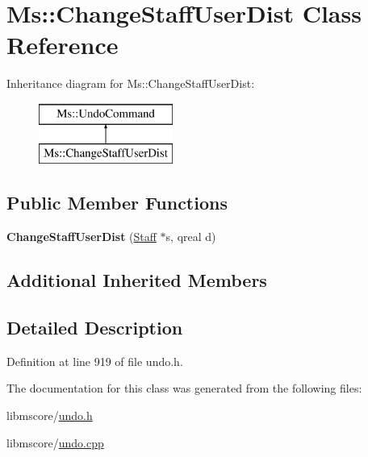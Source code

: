 \hypertarget{class_ms_1_1_change_staff_user_dist}{}\section{Ms\+:\+:Change\+Staff\+User\+Dist Class Reference}
\label{class_ms_1_1_change_staff_user_dist}
Inheritance diagram for Ms\+:\+:Change\+Staff\+User\+Dist\+:\begin{figure}[H]
\begin{center}
\leavevmode
\includegraphics[height=2.000000cm]{class_ms_1_1_change_staff_user_dist}
\end{center}
\end{figure}
\subsection*{Public Member Functions}
\begin{DoxyCompactItemize}
\item 
\mbox{\label{class_ms_1_1_change_staff_user_dist_aaa4ccbc2bb5f9dd038e6dfb45a0f7bb2}} 
{\bfseries Change\+Staff\+User\+Dist} (\hyperlink{class_ms_1_1_staff}{Staff} $\ast$s, qreal d)
\end{DoxyCompactItemize}
\subsection*{Additional Inherited Members}


\subsection{Detailed Description}


Definition at line 919 of file undo.\+h.



The documentation for this class was generated from the following files\+:\begin{DoxyCompactItemize}
\item 
libmscore/\hyperlink{undo_8h}{undo.\+h}\item 
libmscore/\hyperlink{undo_8cpp}{undo.\+cpp}\end{DoxyCompactItemize}
